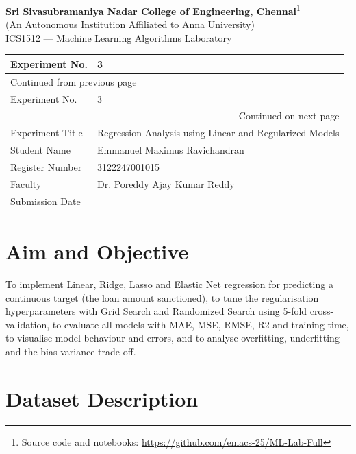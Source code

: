 \documentclass[11pt]{article}
\author{root}
\date{\today}
\title{}
\begin{document}
\begin{center}{\Large\bfseries Sri Sivasubramaniya Nadar College of Engineering, Chennai}\footnote{Source code and notebooks: \url{https://github.com/emacs-25/ML-Lab-Full}}\\[2pt]
(An Autonomous Institution Affiliated to Anna University)\\[2pt]
{\large ICS1512 --- Machine Learning Algorithms Laboratory}\end{center}

\begin{longtable}{|p{4cm}|p{11cm}|}
\hline
Experiment No. & 3\\[0pt]
\hline
\endfirsthead
\multicolumn{2}{l}{Continued from previous page} \\[0pt]
\hline

Experiment No. & 3 \\[0pt]

\hline
\endhead
\hline\multicolumn{2}{r}{Continued on next page} \\
\endfoot
\endlastfoot
\hline
Experiment Title & Regression Analysis using Linear and Regularized Models\\[0pt]
\hline
Student Name & Emmanuel Maximus Ravichandran\\[0pt]
\hline
Register Number & 3122247001015\\[0pt]
\hline
Faculty & Dr. Poreddy Ajay Kumar Reddy\\[0pt]
\hline
Submission Date & \\[0pt]
\hline
\end{longtable}

\section*{Aim and Objective}
\label{sec:orgf1ed525}


To implement Linear, Ridge, Lasso and Elastic Net regression for predicting a continuous
target (the loan amount sanctioned), to tune the regularisation hyperparameters with Grid
Search and Randomized Search using 5-fold cross-validation, to evaluate all models with MAE,
MSE, RMSE, R2 and training time, to visualise model behaviour and errors, and to analyse
overfitting, underfitting and the bias-variance trade-off.

\section*{Dataset Description}
\label{sec:org8ae21e8}
\end{document}
